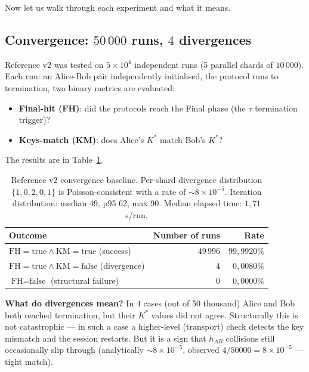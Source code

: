 \documentclass[11pt,a4paper]{article}
\begin{document}
Now let us walk through each experiment and what it means.

\subsection{Convergence: $50\,000$ runs, $4$ divergences}\label{pop:exp-convergence}

Reference v2 was tested on $5 \times 10^4$ independent runs (5 parallel shards of $10\,000$). Each run: an Alice-Bob pair independently initialised, the protocol runs to termination, two binary metrics are evaluated:
\begin{itemize}[leftmargin=*]
\item \textbf{Final-hit (FH)}: did the protocols reach the Final phase (the $\tau$ termination trigger)?
\item \textbf{Keys-match (KM)}: does Alice's $K^*$ match Bob's $K^*$?
\end{itemize}

The results are in Table~\ref{tab:pop-convergence}.

\begin{table}[ht]
\centering
\small
\begin{tabular}{lrr}
\toprule
Outcome & Number of runs & Rate \\
\midrule
$\text{FH}=\text{true} \land \text{KM}=\text{true}$ (success) & $49\,996$ & $99{,}9920\%$ \\
$\text{FH}=\text{true} \land \text{KM}=\text{false}$ (divergence) & $4$ & $0{,}0080\%$ \\
$\text{FH}=\text{false}$ (structural failure) & $0$ & $0{,}0000\%$ \\
\bottomrule
\end{tabular}
\caption{Reference v2 convergence baseline. Per-shard divergence distribution $\{1, 0, 2, 0, 1\}$ is Poisson-consistent with a rate of $\sim 8 \times 10^{-5}$. Iteration distribution: median 49, p95 62, max 90. Median elapsed time: $1{,}71$ s/run.}
\label{tab:pop-convergence}
\end{table}

\textbf{What do divergences mean?} In 4 cases (out of 50 thousand) Alice and Bob both reached termination, but their $K^*$ values did not agree. Structurally this is not catastrophic --- in such a case a higher-level (transport) check detects the key mismatch and the session restarts. But it is a sign that $h_{AB}$ collisions still occasionally slip through (analytically $\sim 8 \times 10^{-5}$, observed $4/50000 = 8 \times 10^{-5}$ --- tight match).
\end{document}
